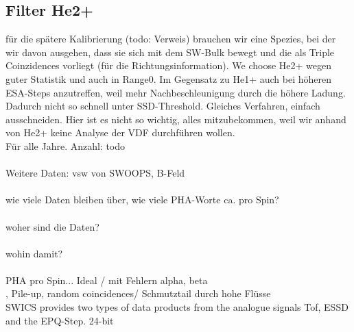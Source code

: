 \subsection{Filter He2+}
für die spätere Kalibrierung (todo: Verweis) brauchen wir eine Spezies, bei der wir davon ausgehen, dass sie sich mit dem SW-Bulk bewegt und die als Triple Coinzidences vorliegt (für die Richtungsinformation). We choose He2+ wegen guter Statistik und auch in Range0. Im Gegensatz zu He1+ auch bei höheren ESA-Steps anzutreffen, weil mehr Nachbeschleunigung durch die höhere Ladung. Dadurch nicht so schnell unter SSD-Threshold. Gleiches Verfahren, einfach ausschneiden. Hier ist es nicht so wichtig, alles mitzubekommen, weil wir anhand von He2+ keine Analyse der VDF durchführen wollen. 
\\
Für alle Jahre. Anzahl: todo
\\ \\
Weitere Daten: vsw von SWOOPS, B-Feld
\\ \\
wie viele Daten bleiben über, wie viele PHA-Worte ca. pro Spin?
\\ \\
woher sind die Daten?
\\ \\
wohin damit? \\ \\
PHA pro Spin...
Ideal / mit Fehlern alpha, beta
\\ , Pile-up, random coincidences/ Schmutztail durch hohe Flüsse
\\
SWICS provides two types of data products from the analogue signals Tof, ESSD and the EPQ-Step.
24-bit
%
%
%

